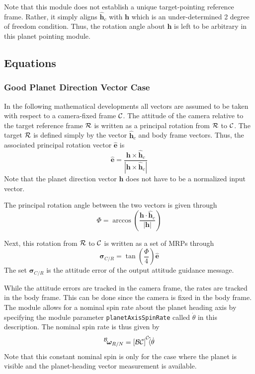 Note that this module does not establish a unique target-pointing reference frame.  Rather, it simply aligns $\hat{\bm h}_{c}$ with $\bm h$ which is an under-determined 2 degree of freedom condition.  Thus, the rotation angle about $\bm h$ is left to be arbitrary in this planet pointing module. 

\subsection{Equations}
\subsubsection{Good Planet Direction Vector Case}\label{sec:withHeading}
In the following mathematical developments all vectors are assumed to be taken with respect to a camera-fixed frame $\cal C$.  The attitude of the camera relative to the target reference frame $\cal R$ is written as a principal rotation from $\cal R$ to $\cal C$. The target $\cal R$ is defined simply by the vector $\hat{\bm h}_{c}$ and body frame vectors. Thus, the associated principal rotation vector $\hat{\bm e}$ is
\begin{equation}
	\label{eq:ssp:1}
	\hat{\bm e} = \frac{\bm h \times \hat{\bm h}_{c}}{|\bm h \times \hat{\bm h}_{c}|}
\end{equation}
Note that the planet direction vector $\bm h$ does not have to be a normalized input vector.  

The principal rotation angle between the two vectors is given through
\begin{equation}
	\label{eq:ssp:2}
	\Phi = \arccos \left( \frac{\bm h  \cdot \hat{\bm h}_{c} }{|\bm h|} \right)
\end{equation}

Next, this rotation from $\cal R$ to $\cal C$ is written as a set of MRPs through
\begin{equation}
	\label{eq:ssp:3}
	\bm\sigma_{C/R} = \tan\left(\frac{\Phi}{4}\right) \hat{\bm e}
\end{equation}
The set $\bm\sigma_{C/R}$ is the attitude error of the output attitude guidance message.  

While the attitude errors are tracked in the camera frame, the rates are tracked in the body frame. This can be done since the camera is fixed in the body frame.
The module allows for a nominal spin rate about the planet heading axis by specifying the module parameter {\tt planetAxisSpinRate} called $\dot \theta$ in this description.  The nominal spin rate is thus given by
\begin{equation}
	\leftexp{B}{\bm\omega}_{R/N} = [\cal B \cal C]\leftexp{C}{\hat{\bm h}} \dot\theta
\end{equation}
Note that this constant nominal spin is only for the case where the planet is visible and the planet-heading vector measurement is available. 

